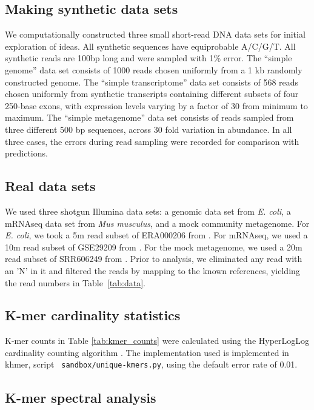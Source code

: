 \documentclass{article}
\begin{document}
\subsection{Making synthetic data sets}

We computationally constructed three small short-read DNA data sets
for initial exploration of ideas.  All synthetic sequences have
equiprobable A/C/G/T.  All synthetic reads are 100bp long and were
sampled with 1\% error.  The ``simple genome'' data set consists of
1000 reads chosen uniformly from a 1 kb randomly constructed genome.
The ``simple transcriptome'' data set consists of 568 reads chosen
uniformly from synthetic transcripts containing different subsets of
four 250-base exons, with expression levels varying by a factor of 30
from minimum to maximum.  The ``simple metagenome'' data set consists
of reads sampled from three different 500 bp sequences, across 30 fold
variation in abundance.  In all three cases, the errors during read
sampling were recorded for comparison with predictions.

\subsection{Real data sets}

We used three shotgun Illumina data sets: a genomic data set from {\em
  E. coli}, a mRNAseq data set from {\em Mus musculus}, and a mock
community metagenome.  For {\em E. coli}, we took a 5m read subset of
ERA000206 from \cite{chitsaz}.  For mRNAseq, we used a 10m read subset
of GSE29209 from \cite{trinityrna}.  For the mock metagenome, we used
a 20m read subset of SRR606249 from \cite{podar}.  Prior to analysis,
we eliminated any read with an 'N' in it and filtered the reads by
mapping to the known references, yielding the read numbers in
Table~\ref{tab:data}.

\subsection{K-mer cardinality statistics}

K-mer counts in Table \ref{tab:kmer_counts} were calculated using the
HyperLogLog cardinality counting algorithm \cite{hll}.  The
implementation used is implemented in khmer, script {\tt
  sandbox/unique-kmers.py}, using the default error rate of 0.01.



\subsection{K-mer spectral analysis}
\end{document}
